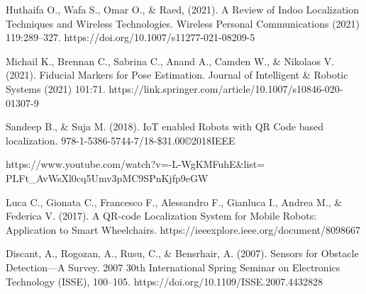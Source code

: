 

\newpage
{}
\renewcommand{\bibname}{References}

\begin{thebibliography}{9}
	\bibitem{}
	Huthaifa O., Wafa S., Omar O., \& Raed, (2021). A Review of Indoo Localization Techniques and Wireless Technologies. Wireless Personal Communications (2021) 119:289–327.\newline
	https://doi.org/10.1007/s11277-021-08209-5
	
	\bibitem{}
	Michail K., Brennan C., Sabrina C., Anand A., Camden W., \& Nikolaos V. (2021). Fiducial Markers for Pose Estimation. 
	Journal of Intelligent \& Robotic Systems (2021) 101:71.\newline
	https://link.springer.com/article/10.1007/s10846-020-01307-9
	
	\bibitem{}
	Sandeep B., \& Suja M. (2018). IoT enabled Robots with QR Code based 
	localization. 978-1-5386-5744-7/18-\$31.00©2018IEEE
	
	\bibitem{}
	\sloppy
	https://www.youtube.com/watch?v=-L-WgKMFuhE\&list= PLFt\_AvWsXl0cq5Umv3pMC9SPnKjfp9eGW
	
	\bibitem{}
	\sloppy
	Luca C., Gionata C., Francesco F., Alessandro F., Gianluca I.,  Andrea M., \&  Federica V. (2017). A QR-code Localization System for Mobile Robots:	Application to Smart Wheelchairs.
	https://ieeexplore.ieee.org/document/8098667

	\color{red}
	\bibitem{}
	Discant, A., Rogozan, A., Rusu, C., \& Bensrhair, A. (2007). Sensors for Obstacle Detection—A Survey. 2007 30th International Spring Seminar on Electronics Technology (ISSE), 100–105. https://doi.org/10.1109/ISSE.2007.4432828
	\color{black}
\end{thebibliography}
